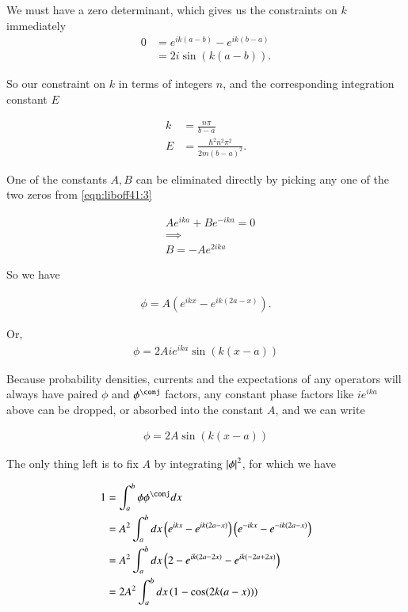 We must have a zero determinant, which gives us the constraints on $k$ immediately
\begin{align*}
0 &= e^{i k (a - b)} - e^{i k (b-a)} \\
&= 2 i \sin( k (a - b) ).
\end{align*}

So our constraint on $k$ in terms of integers $n$, and the corresponding integration constant $E$

\begin{align}\label{eqn:liboff41:4}
k &= \frac{n \pi}{b - a} \\
E &= \frac{\hbar^2 n^2 \pi^2 }{2 m (b-a)^2}.
\end{align}

One of the constants $A,B$ can be eliminated directly by picking any one of the two zeros from \ref{eqn:liboff41:3}

\begin{align*}
&A e ^{i k a } + B e^{-i k a} = 0 \\
&\implies \\
&B = -A e ^{2 i k a } 
\end{align*}

So we have

\begin{align}\label{eqn:liboff41:5}
\phi = A \left( e^{i k x } - e^{ ik (2a - x) } \right).
\end{align}

Or,
\begin{align}\label{eqn:liboff41:5b}
\phi = 2 A i e^{i k a} \sin( k (x-a )) 
\end{align}

Because probability densities, currents and the expectations of any operators will always have paired $\phi$ and $\phi^\conj$ factors, any constant phase factors like $i e^{i k a}$ above can be dropped, or absorbed into the constant $A$, and we can write

\begin{align}\label{eqn:liboff41:5d}
\phi = 2 A \sin( k (x-a )) 
\end{align}

The only thing left is to fix $A$ by integrating $\left\lvert{\phi}\right\rvert^2$, for which we have

\begin{align*}
1 &= \int_a^b \phi \phi^\conj dx \\
&= A^2 \int_a^b dx \left( e^{i k x } - e^{ ik (2a - x) } \right) \left( e^{-i k x } - e^{ -ik (2a - x) } \right) \\
&= A^2 \int_a^b dx \left( 2 - e^{ik(2a - 2x)} - e^{ik(-2a + 2x)} \right) \\
&= 2 A^2 \int_a^b dx \left( 1 - \cos (2 k (a - x)) \right)
\end{align*}

